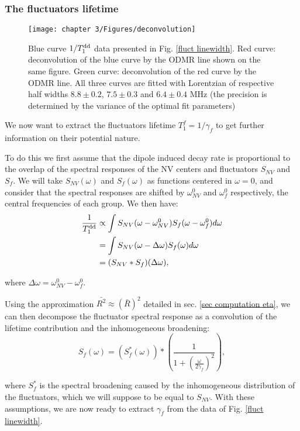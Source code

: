 \documentclass[a4paper, 11pt]{book}
\begin{document}
\subsubsection{The fluctuators lifetime}
\begin{figure}[h]
\centering
\texttt{[image: chapter 3/Figures/deconvolution]}
\caption{Blue curve $1/T_1^{\rm dd}$ data presented in Fig. \ref{fluct linewidth}. Red curve: deconvolution of the blue curve by the ODMR line shown on the same figure. Green curve: deconvolution of the red curve   by the ODMR line. All three curves are fitted with Lorentzian of respective half widths $8.8 \pm 0.2$, $7.5 \pm 0.3$ and $6.4 \pm 0.4$ MHz (the precision is determined by the variance of the optimal fit parameters)}
\label{deconvolution}
\end{figure}

We now want to extract the fluctuators lifetime $T_1^f=1/\gamma_f$ to get further information on their potential nature. 

To do this we first assume that the dipole induced decay rate is proportional to the overlap of the spectral responses of the NV centers and fluctuators $S_{NV}$ and $S_f$. We will take $S_{NV}( \omega)$ and $S_{f}( \omega)$ as functions centered in $\omega=0$, and consider that the spectral responses are shifted by $\omega^0_{NV}$ and $\omega^0_{f}$ respectively, the central frequencies of each group. We then have:
\begin{align*}
\frac{1}{T_1^{\rm dd}} &\propto \int S_{NV} (\omega-\omega_{NV}^0) S_f (\omega-\omega_{f}^0) d\omega \\
&= \int S_{NV} (\omega-\Delta \omega) S_f (\omega)
 d\omega \\
 &= (S_{NV}*S_{f})(\Delta \omega),
\end{align*}

where $\Delta \omega=\omega_{NV}^0-\omega_{f}^0$.

Using the approximation $\bar {R ^2} \approx (\bar{R})^2$ detailed in sec. \ref{sec computation eta}, we can then decompose the fluctuator spectral response as a convolution of the lifetime contribution and the inhomogeneous broadening:
\begin{equation}
S_{f}(\omega)=\left(S_f^*(\omega)\right)*\left(\frac{1}{1+\left(\frac{\omega}{2 \gamma_f}\right)^2} \right),
\end{equation}

where $S_f^*$ is the spectral broadening caused by the inhomogeneous distribution of the fluctuators, which we will suppose to be equal to $S_{NV}$. With these assumptions, we are now ready to extract $\gamma_f$ from the data of Fig. \ref{fluct linewidth}.
\end{document}

